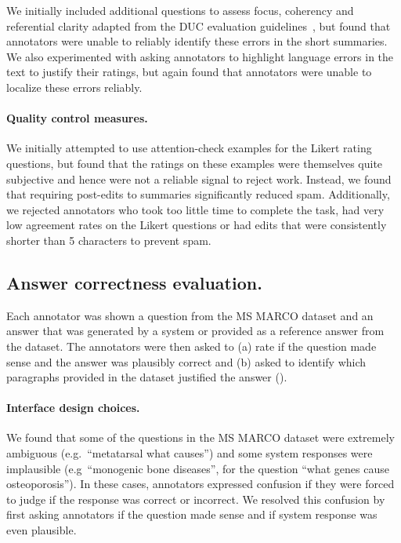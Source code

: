 We initially included additional questions to assess focus, coherency and referential clarity adapted from the DUC evaluation guidelines~\citep{dang2006overview}, but found that annotators were unable to reliably identify these errors in the short summaries.
We also experimented with asking annotators to highlight language errors in the text to justify their ratings, but again found that annotators were unable to localize these errors reliably.

\paragraph{Quality control measures.}

We initially attempted to use attention-check examples for the Likert rating questions, but found that the ratings on these examples were themselves quite subjective and hence were not a reliable signal to reject work.
Instead, we found that requiring post-edits to summaries significantly reduced spam.
Additionally, we rejected annotators who took too little time to complete the task, had very low agreement rates on the Likert questions or had edits that were consistently shorter than 5 characters to prevent spam.

\subsection{Answer correctness evaluation.}
Each annotator was shown a question from the MS MARCO dataset and an answer that was generated by a system or provided as a reference answer from the dataset.
The annotators were then asked to (a) rate if the question made sense and the answer was plausibly correct and (b) asked to identify which paragraphs provided in the dataset justified the answer ().

\paragraph{Interface design choices.}
We found that some of the questions in the MS MARCO dataset were extremely ambiguous (e.g.\ ``metatarsal what causes'') and some system responses were implausible (e.g\ ``monogenic bone diseases'', for the question ``what genes cause osteoporosis'').
In these cases, annotators expressed confusion if they were forced to judge if the response was correct or incorrect.
We resolved this confusion by first asking annotators if the question made sense and if system response was even plausible.

